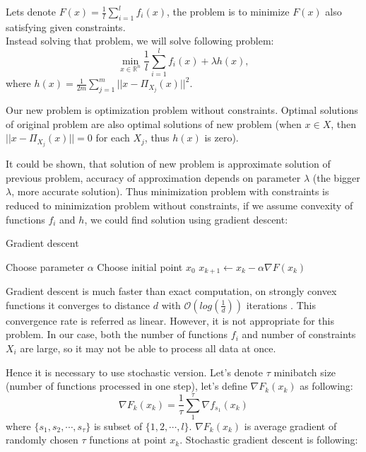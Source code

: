 \documentclass[11pt]{book}
\newcommand{\R}{\mathbb{R}}
\begin{document}
Lets denote $F(x)=\frac{1}{l}\sum_{i=1}^l f_i(x)$, the problem is to minimize $F(x)$ also satisfying given constraints.\\

Instead solving that problem, we will solve following problem: \label{solvedProblem}
$$ \min_{x \in \R^n} \frac{1}{l}\sum_{i=1}^l f_i(x) + \lambda h(x),$$
where $h(x)=\frac{1}{2m}\sum_{j=1}^m ||x-\Pi_{X_j}(x)||^2$.

Our new problem is optimization problem without constraints.
Optimal solutions of original problem are also optimal solutions of new problem (when $x \in X$, then $||x-\Pi_{X_j}(x)||=0$ for each $X_j$, thus $h(x)$ is zero).

It could be shown, that solution of new problem is approximate solution of previous problem, accuracy of approximation depends on parameter $\lambda$ (the bigger $\lambda$, more accurate solution). Thus minimization problem with constraints is reduced to minimization problem without constraints, if we assume convexity of functions $f_i$ and $h$, we could find solution using gradient descent:\\

\begin{algorithm}[H]
	\caption{Gradient descent}
	\label{alg:gd}
	\begin{algorithmic}[1]
		\State Choose parameter $\alpha$
		\State Choose initial point $x_0$
		\State $x_{k+1} \leftarrow x_k - \alpha\nabla F(x_k) $
		\EndFor
	\end{algorithmic}
\end{algorithm}

Gradient descent is much faster than exact computation, on strongly convex functions it converges to distance $d$ with $\mathcal{O}(log(\frac{1}{d}))$ iterations \cite{GD} . This convergence rate is referred as linear. However, it is not appropriate for this problem. In our case, both the number of functions $f_i$ and number of constraints $X_i$ are large, so it may not be able to process all data at once.

Hence it is necessary to use stochastic version. Let's denote $\tau$ minibatch size (number of functions processed in one step), let's define $\nabla F_k(x_k)$ as following: $$\nabla F_k(x_k) = \frac{1}{\tau}\sum_1^\tau \nabla f_{s_1}(x_k)$$ where $\{s_1, s_2, \cdots, s_\tau\}$ is subset of $\{1,2,\cdots, l \}$. $\nabla F_k(x_k)$ is average gradient of randomly chosen $\tau$ functions at point $x_k$. Stochastic gradient descent is following:
\end{document}
